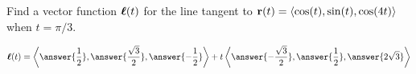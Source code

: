 \documentclass{ximera}
\author{David Guichard \and Neal Koblitz \and H. Jerome Keisler \and Albert Scheller \and Barry Balof \and Mike Wills \and Matthew Carr}
\begin{document}
\begin{exercise}




Find a vector function $\boldsymbol{\ell}(t)$ for the line tangent to $\mathbf{r}(t)=\left\langle \cos(t),\sin(t),\cos(4t)\right\rangle$ when $t=\pi/3$.

\begin{prompt}
\[
\vecl(t)=\vector{\answer{\frac{1}{2}},\answer{\frac{\sqrt{3}}{2}},\answer{-\frac{1}{2}}}+t\vector{\answer{-\frac{\sqrt{3}}{2}},\answer{\frac{1}{2}},\answer{2\sqrt{3}}}
\]
\end{prompt}


\end{exercise}
\end{document}
